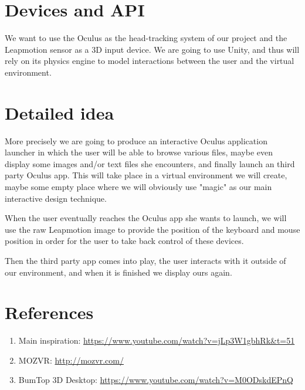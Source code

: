 \documentclass[paper=a4, fontsize=11pt]{scrartcl} %
\numberwithin{equation}{section} %
\numberwithin{figure}{section} %
\numberwithin{table}{section} %
\begin{document}

\section{Devices and API}
We want to use the Oculus as the head-tracking system of our project and the Leapmotion sensor as a 3D input device. We are going to use Unity, and thus will rely on its physics engine to model interactions between the user and the virtual environment.


\section{Detailed idea}
More precisely we are going to produce an interactive Oculus application launcher in which the user will be able to browse various files, maybe even display some images and/or text files she encounters, and finally launch an third party Oculus app. This will take place in a virtual environment we will create, maybe some empty place where we will obviously use "magic" as our main interactive design technique.

When the user eventually reaches the Oculus app she wants to launch, we will use the raw Leapmotion image to provide the position of the keyboard and mouse position in order for the user to take back control of these devices. 

Then the third party app comes into play, the user interacts with it outside of our environment, and when it is finished we display ours again.


\section{References}
\label{sec:refs}
\begin{enumerate}
\item Main inspiration: \url{https://www.youtube.com/watch?v=jLp3W1gbhRk&t=51}
\item MOZVR: \url{http://mozvr.com/}
\item BumTop 3D Desktop: \url{https://www.youtube.com/watch?v=M0ODskdEPnQ}
\end{enumerate}
\end{document}
